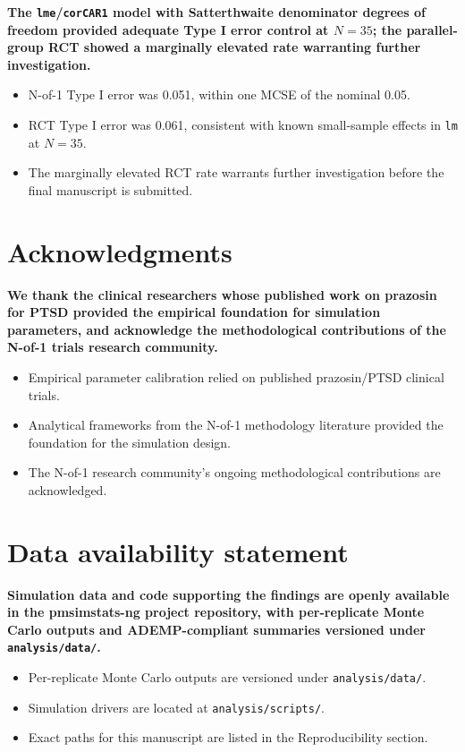 \documentclass[
  11pt,
]{article}
\begin{document}
\textbf{The \texttt{lme}/\texttt{corCAR1} model with Satterthwaite denominator degrees of freedom provided adequate Type I error control at $N = 35$; the parallel-group RCT showed a marginally elevated rate warranting further investigation.}

\begin{itemize}\setlength{\itemsep}{2pt}\setlength{\parskip}{0pt}
\item N-of-1 Type I error was 0.051, within one MCSE of the nominal 0.05.
\item RCT Type I error was 0.061, consistent with known small-sample effects in \texttt{lm} at $N = 35$.
\item The marginally elevated RCT rate warrants further investigation before the final manuscript is submitted.
\end{itemize}

\section{Acknowledgments}\label{acknowledgments}

\textbf{We thank the clinical researchers whose published work on prazosin for PTSD provided the empirical foundation for simulation parameters, and acknowledge the methodological contributions of the N-of-1 trials research community.}

\begin{itemize}\setlength{\itemsep}{2pt}\setlength{\parskip}{0pt}
\item Empirical parameter calibration relied on published prazosin/PTSD clinical trials.
\item Analytical frameworks from the N-of-1 methodology literature provided the foundation for the simulation design.
\item The N-of-1 research community's ongoing methodological contributions are acknowledged.
\end{itemize}

\section{Data availability statement}\label{data-availability-statement}

\textbf{Simulation data and code supporting the findings are openly available in the pmsimstats-ng project repository, with per-replicate Monte Carlo outputs and ADEMP-compliant summaries versioned under \texttt{analysis/data/}.}

\begin{itemize}\setlength{\itemsep}{2pt}\setlength{\parskip}{0pt}
\item Per-replicate Monte Carlo outputs are versioned under \texttt{analysis/data/}.
\item Simulation drivers are located at \texttt{analysis/scripts/}.
\item Exact paths for this manuscript are listed in the Reproducibility section.
\end{itemize}
\end{document}
